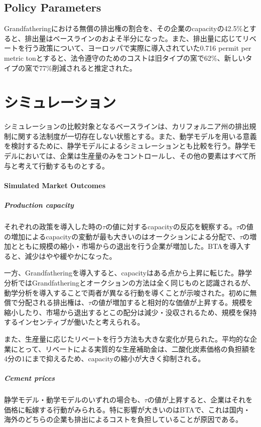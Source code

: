 \documentclass[11pt]{jsarticle}
\begin{document}
\subsection{Policy Parameters}

Grandfatheringにおける無償の排出権の割合を、その企業のcapacityの42.5\%とすると、排出量はベースラインのおよそ半分になった。また、排出量に応じてリベートを行う政策について、ヨーロッパで実際に導入されていた0.716 permit per metric tonとすると、法令遵守のためのコストは旧タイプの窯で62\%、新しいタイプの窯で77\%削減されると推定された。

\section{シミュレーション}

シミュレーションの比較対象となるベースラインは、カリフォルニア州の排出規制に関する法制度が一切存在しない状態とする。また、動学モデルを用いる意義を検討するために、静学モデルによるシミュレーションとも比較を行う。静学モデルにおいては、企業は生産量のみをコントロールし、その他の要素はすべて所与と考えて行動するものとする。

\paragraph{Simulated Market Outcomes}

\subparagraph{Production capacity}

それぞれの政策を導入した時の$\tau$の値に対するcapacityの反応を観察する。$\tau$の値の増加によるcapacityの変動が最も大きいのはオークションによる分配で、$\tau$の増加とともに規模の縮小・市場からの退出を行う企業が増加した。BTAを導入すると、減少はやや緩やかになった。

一方、Grandfatheringを導入すると、capacityはある点から上昇に転じた。静学分析ではGrandfatheringとオークションの方法は全く同じものと認識されるが、動学分析を導入することで両者が異なる行動を導くことが示唆された。初めに無償で分配される排出権は、$\tau$の値が増加すると相対的な価値が上昇する。規模を縮小したり、市場から退出するとこの配分は減少・没収されるため、規模を保持するインセンティブが働いたと考えられる。

また、生産量に応じたリベートを行う方法も大きな変化が見られた。平均的な企業にとって、リベートによる実質的な生産補助金は、二酸化炭素価格の負担額を4分の1にまで抑えるため、capacityの縮小が大きく抑制される。

\subparagraph{Cement prices}

静学モデル・動学モデルのいずれの場合も、$\tau$の値が上昇すると、企業はそれを価格に転嫁する行動がみられる。特に影響が大きいのはBTAで、これは国内・海外のどちらの企業も排出によるコストを負担していることが原因である。
\end{document}
